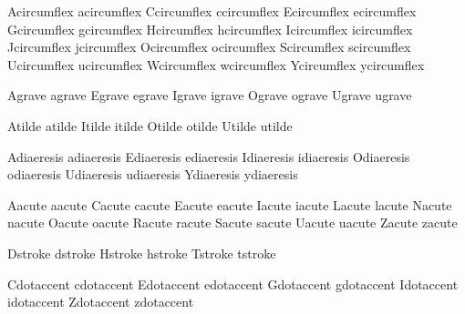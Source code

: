 

 Acircumflex acircumflex
 Ccircumflex ccircumflex
 Ecircumflex ecircumflex
 Gcircumflex gcircumflex
 Hcircumflex hcircumflex
 Icircumflex icircumflex
 Jcircumflex jcircumflex
 Ocircumflex ocircumflex
 Scircumflex scircumflex
 Ucircumflex ucircumflex
 Wcircumflex wcircumflex
 Ycircumflex ycircumflex

 Agrave agrave
 Egrave egrave
 Igrave igrave
 Ograve ograve
 Ugrave ugrave

 Atilde atilde
 Itilde itilde
 Otilde otilde
 Utilde utilde

 Adiaeresis adiaeresis
 Ediaeresis ediaeresis
 Idiaeresis idiaeresis
 Odiaeresis odiaeresis
 Udiaeresis udiaeresis
 Ydiaeresis ydiaeresis

 Aacute aacute
 Cacute cacute
 Eacute eacute
 Iacute iacute
 Lacute lacute
 Nacute nacute
 Oacute oacute
 Racute racute
 Sacute sacute
 Uacute uacute
 Zacute zacute

 Dstroke dstroke
 Hstroke hstroke
 Tstroke tstroke

 Cdotaccent cdotaccent
 Edotaccent edotaccent
 Gdotaccent gdotaccent
 Idotaccent idotaccent
 Zdotaccent zdotaccent

